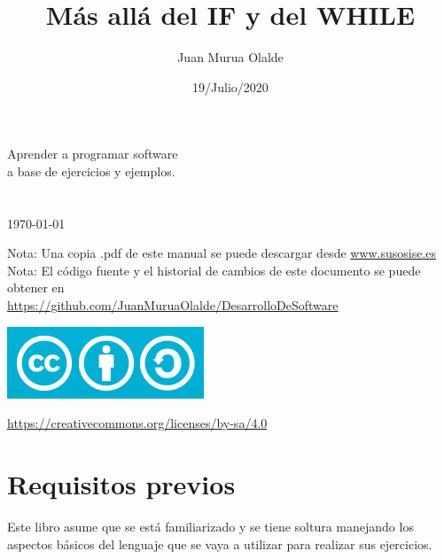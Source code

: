 \documentclass[spanish,12pt,a4paper,final,oneside]{book}
\title{Más allá del IF y del WHILE}
\author{Juan Murua Olalde}
\date{19/Julio/2020}
\begin{document}
\begin{titlepage}

\begin{flushright}
\vspace{2cm}
\begin{Huge}\MyTitle\end{Huge}

Aprender a programar software\\ a base de ejercicios y ejemplos.
\\
\vspace{1cm}
\MyAuthor
\\
\vspace{1cm}
\MyDate
\\ \today
\\
\end{flushright}

\vfill
Nota: Una copia .pdf de este manual se puede descargar desde \url{www.susosise.es}
\\Nota: El código fuente y el historial de cambios de este documento se puede obtener en  \\ \url{https://github.com/JuanMuruaOlalde/DesarrolloDeSoftware}
\begin{flushleft}
\includegraphics[scale=0.3]{CreativeCommons-Attribution-ShareAlike-logo}
\begin{small}\url{https://creativecommons.org/licenses/by-sa/4.0}\end{small}
\end{flushleft}

\end{titlepage}

\hypersetup{linkcolor=black}
\tableofcontents


\chapter*{Requisitos previos}
Este libro asume que se está familiarizado y se tiene soltura manejando los aspectos básicos del lenguaje que se vaya a utilizar para realizar sus ejercicios.
\end{document}
